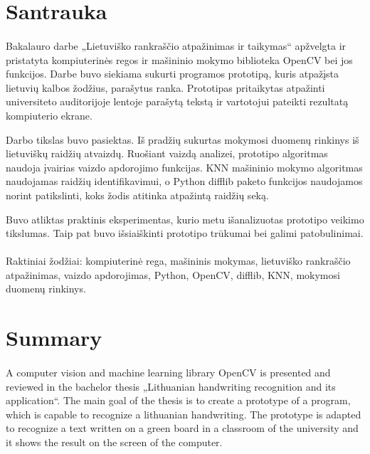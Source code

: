 \documentclass[a4paper,12pt]{article}
\begin{document}
\clearpage 
\section*{Santrauka}
\paragraph{}Bakalauro darbe „Lietuviško rankraščio atpažinimas ir taikymas“ apžvelgta ir pristatyta kompiuterinės regos ir mašininio mokymo biblioteka OpenCV bei jos funkcijos. Darbe buvo siekiama sukurti programos prototipą, kuris atpažįsta lietuvių kalbos žodžius, parašytus ranka. Prototipas pritaikytas atpažinti universiteto auditorijoje lentoje parašytą tekstą ir vartotojui pateikti rezultatą kompiuterio ekrane.

Darbo tikslas buvo pasiektas. Iš pradžių sukurtas mokymosi duomenų rinkinys iš lietuviškų raidžių atvaizdų. Ruošiant vaizdą analizei, prototipo algoritmas naudoja įvairias vaizdo apdorojimo funkcijas. KNN mašininio mokymo algoritmas naudojamas raidžių identifikavimui, o Python difflib paketo funkcijos naudojamos norint patikslinti, koks žodis atitinka atpažintą raidžių seką.

Buvo atliktas praktinis eksperimentas, kurio metu išanalizuotas prototipo veikimo tikslumas. Taip pat buvo išsiaiškinti prototipo trūkumai bei galimi patobulinimai.
\newline
\newline
\paragraph{}Raktiniai žodžiai: kompiuterinė rega, mašininis mokymas, lietuviško rankraščio atpažinimas, vaizdo apdorojimas, Python, OpenCV, difflib, KNN, mokymosi duomenų rinkinys.


\clearpage
\section*{Summary}
\paragraph{}A computer vision and machine learning library OpenCV is presented and reviewed in the bachelor thesis „Lithuanian handwriting recognition and its application“. The main goal of the thesis is to create a prototype of a program, which is capable to recognize a lithuanian handwriting. The prototype is adapted to recognize a text written on a green board in a classroom of the university and it shows the result on the screen of the computer.
\end{document}
